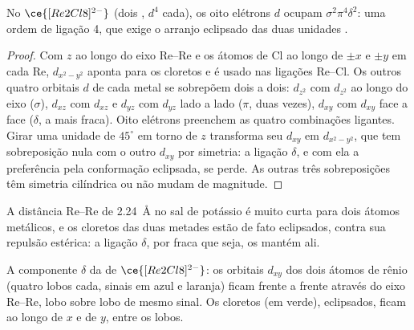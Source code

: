 \begin{proposition}\label{prop:b3:organometallic-bonding:quadruple}
No $\ce{[Re2Cl8]^{2-}}$ (dois , $d^4$ cada), os oito elétrons $d$ ocupam $\sigma^2\pi^4\delta^2$: uma ordem
de ligação 4, que exige o arranjo eclipsado das duas unidades .
\end{proposition}

\begin{proof}
Com $z$ ao longo do eixo Re--Re e os átomos de Cl ao longo de $\pm x$ e $\pm y$ em cada Re, $d_{x^2-y^2}$
aponta para os cloretos e é usado nas ligações Re--Cl. Os outros quatro orbitais $d$
de cada metal se sobrepõem dois a dois: $d_{z^2}$ com $d_{z^2}$ ao longo do eixo ($\sigma$), $d_{xz}$ com $d_{xz}$ e $d_{yz}$
com $d_{yz}$ lado a lado ($\pi$, duas vezes), $d_{xy}$ com $d_{xy}$ face a face ($\delta$, a mais fraca).
Oito elétrons preenchem as quatro combinações ligantes. Girar uma unidade de $45^\circ$
em torno de $z$ transforma seu $d_{xy}$ em $d_{x^2-y^2}$, que tem sobreposição nula com o outro $d_{xy}$ por
simetria: a ligação $\delta$, e com ela a preferência pela conformação eclipsada, se perde. As
outras três sobreposições têm simetria cilíndrica ou não mudam de magnitude.
\end{proof}

A distância Re--Re de \qty{2.24}{\angstrom} no sal de potássio é muito curta para dois átomos metálicos, e os cloretos das duas metades estão de fato eclipsados, contra
sua repulsão estérica: a ligação $\delta$, por fraca que seja, os mantém ali.

\begin{omfigure}

{\small A componente $\delta$ da  de $\ce{[Re2Cl8]^{2-}}$: os orbitais $d_{xy}$ dos
dois átomos de rênio (quatro lobos cada, sinais em azul e laranja) ficam frente a frente
através do eixo Re--Re, lobo sobre lobo de mesmo sinal. Os cloretos (em verde),
eclipsados, ficam ao longo de $x$ e de $y$, entre os lobos.}
\end{omfigure}

